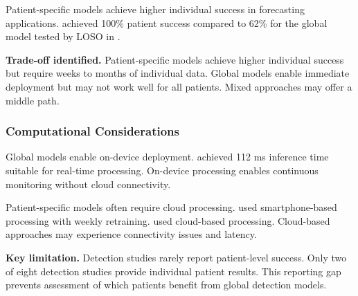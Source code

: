 Patient-specific models achieve higher individual success in forecasting applications. \textcite{stirlingForecastingSeizureLikelihood2021} achieved 100\% patient success compared to 62\% for the global model tested by LOSO in \textcite{meiselMachineLearningWristband2020}.

\textbf{Trade-off identified.} Patient-specific models achieve higher individual success but require weeks to months of individual data. Global models enable immediate deployment but may not work well for all patients. Mixed approaches may offer a middle path.

\subsubsection{Computational Considerations}

Global models enable on-device deployment. \textcite{spahrDeepLearningbasedDetection2025} achieved 112 ms inference time suitable for real-time processing. On-device processing enables continuous monitoring without cloud connectivity.

Patient-specific models often require cloud processing. \textcite{stirlingForecastingSeizureLikelihood2021} used smartphone-based processing with weekly retraining. \textcite{nasseriAmbulatorySeizureForecasting2021} used cloud-based processing. Cloud-based approaches may experience connectivity issues and latency.

\textbf{Key limitation.} Detection studies rarely report patient-level success. Only two of eight detection studies provide individual patient results. This reporting gap prevents assessment of which patients benefit from global detection models.
